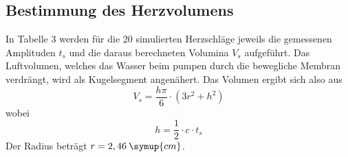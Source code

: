 


\subsection{Bestimmung des Herzvolumens}
In Tabelle 3 werden für die 20 simulierten Herzschläge jeweils die gemessenen Amplituden $t_s$ und die daraus berechneten
Volumina $V_s$ aufgeführt. Das Luftvolumen, welches das Wasser beim pumpen durch die bewegliche Membran verdrängt, wird als
Kugelsegment angenähert. Das Volumen ergibt sich also aus
\begin{equation*}
  V_s = \frac{h\pi}{6}\cdot(3r^2 + h^2)
\end{equation*}
wobei
\begin{equation*}
  h = \frac{1}{2}\cdot c \cdot t_s
\end{equation*}
Der Radius beträgt $r = 2,46 \: \symup{cm}$.

